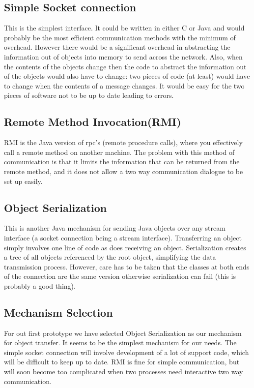 \documentclass[10pt,a4paper]{article}
\begin{document}
\subsection{Simple Socket connection}
This is the simplest interface. It could be written in either C or Java and would probably be the most efficient 
communication methods with the minimum of overhead. However there would be a significant overhead in abstracting 
the information out of objects into memory to send across the network. 
Also, when the contents of the objects change then the code to abstract the information out of the objects would 
also have to change: two pieces of code (at least) would have to change when the contents of a message changes.
It would be easy for the two pieces of software not to be up to date leading to errors.

\subsection{Remote Method Invocation(RMI)}
RMI is the Java version of rpc's (remote procedure calls), where you effectively call a remote method on another 
machine. The problem with this method of communication is that it limits the information that can be returned from 
the remote method, and it does not allow a two way communication dialogue to be set up easily.

\subsection{Object Serialization}
This is another Java mechanism for sending Java objects over any stream interface (a socket connection being a 
stream interface). Transferring an object simply involves one line of code as does receiving an object. 
Serialization creates a tree of all objects referenced by the root object, simplifying the data transmission process. 
However, care has to be taken that the classes at both ends of the connection are the same version otherwise 
serialization can fail (this is probably a good thing). 

\subsection{Mechanism Selection}
For out first prototype we have selected Object Serialization as our mechanism for object transfer. 
It seems to be the simplest mechanism for our needs. The simple socket connection will involve development of
a lot of support code, which will be difficult to keep up to date. RMI is fine for simple communication, but will
soon become too complicated when two processes need interactive two way communication.
\end{document}
